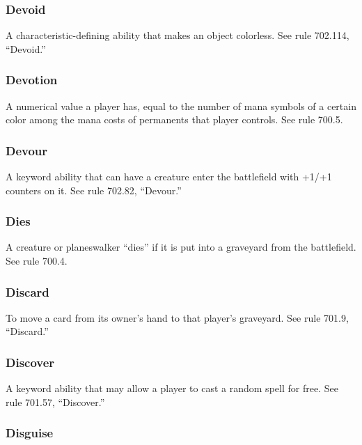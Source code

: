 {{{{{{\subsubsection*{Devoid}

A characteristic-defining ability that makes an object colorless. See rule 702.114, “Devoid.”

\subsubsection*{Devotion}

A numerical value a player has, equal to the number of mana symbols of a certain color among the mana costs of permanents that player controls. See rule 700.5.

\subsubsection*{Devour}

A keyword ability that can have a creature enter the battlefield with +1/+1 counters on it. See rule 702.82, “Devour.”

\subsubsection*{Dies}

A creature or planeswalker “dies” if it is put into a graveyard from the battlefield. See rule 700.4.

\subsubsection*{Discard}

To move a card from its owner’s hand to that player’s graveyard. See rule 701.9, “Discard.”

\subsubsection*{Discover}

A keyword ability that may allow a player to cast a random spell for free. See rule 701.57, “Discover.”

\subsubsection*{Disguise}

}}}}}}

